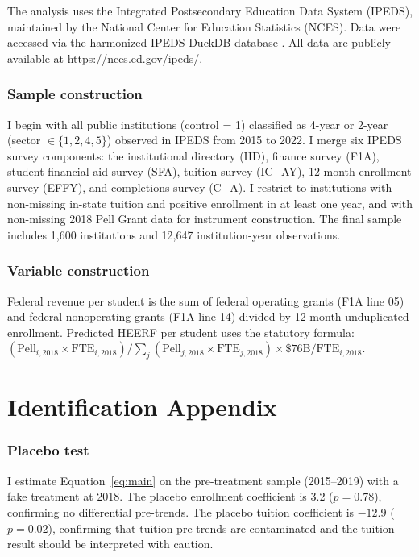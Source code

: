 \documentclass[12pt]{article}
\begin{document}
The analysis uses the Integrated Postsecondary Education Data System (IPEDS), maintained by the National Center for Education Statistics (NCES). Data were accessed via the harmonized IPEDS DuckDB database \citep{baum2018}. All data are publicly available at \url{https://nces.ed.gov/ipeds/}.

\subsubsection*{Sample construction} I begin with all public institutions (control = 1) classified as 4-year or 2-year (sector $\in \{1, 2, 4, 5\}$) observed in IPEDS from 2015 to 2022. I merge six IPEDS survey components: the institutional directory (HD), finance survey (F1A), student financial aid survey (SFA), tuition survey (IC\_AY), 12-month enrollment survey (EFFY), and completions survey (C\_A). I restrict to institutions with non-missing in-state tuition and positive enrollment in at least one year, and with non-missing 2018 Pell Grant data for instrument construction. The final sample includes 1,600 institutions and 12,647 institution-year observations.

\subsubsection*{Variable construction} Federal revenue per student is the sum of federal operating grants (F1A line 05) and federal nonoperating grants (F1A line 14) divided by 12-month unduplicated enrollment. Predicted HEERF per student uses the statutory formula: $(\text{Pell}_{i,2018} \times \text{FTE}_{i,2018}) / \sum_j (\text{Pell}_{j,2018} \times \text{FTE}_{j,2018}) \times \$76\text{B} / \text{FTE}_{i,2018}$.

\section{Identification Appendix}

\subsubsection*{Placebo test} I estimate Equation~\ref{eq:main} on the pre-treatment sample (2015--2019) with a fake treatment at 2018. The placebo enrollment coefficient is 3.2 ($p = 0.78$), confirming no differential pre-trends. The placebo tuition coefficient is $-12.9$ ($p = 0.02$), confirming that tuition pre-trends are contaminated and the tuition result should be interpreted with caution.
\end{document}
